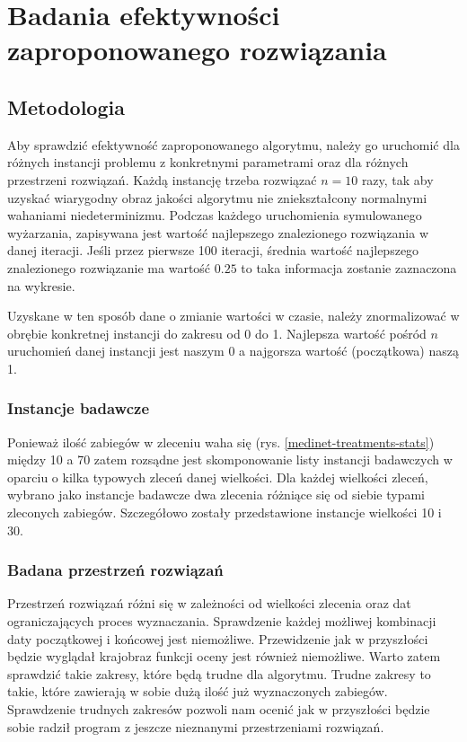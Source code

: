 \chapter{Badania efektywności zaproponowanego rozwiązania}
\section{Metodologia}
Aby sprawdzić efektywność zaproponowanego algorytmu, należy go uruchomić dla różnych instancji problemu
z konkretnymi parametrami oraz dla różnych przestrzeni rozwiązań. Każdą instancję trzeba rozwiązać $n=10$ razy,
tak aby uzyskać wiarygodny obraz jakości algorytmu nie
zniekształcony normalnymi wahaniami niedeterminizmu. Podczas każdego uruchomienia symulowanego wyżarzania,
zapisywana jest wartość najlepszego znalezionego rozwiązania w danej iteracji. Jeśli przez pierwsze 100 iteracji,
średnia wartość najlepszego znalezionego rozwiązanie ma wartość
$0.25$ to taka informacja zostanie zaznaczona na wykresie.

Uzyskane w ten sposób dane o zmianie wartości w czasie, należy
znormalizować w obrębie konkretnej instancji do zakresu od 0 do 1. Najlepsza wartość
pośród $n$ uruchomień danej instancji jest naszym 0 a najgorsza wartość
(początkowa) naszą 1.

\subsection{Instancje badawcze}
Ponieważ ilość zabiegów w zleceniu waha się (rys. \ref{medinet-treatments-stats}) między 10 a 70
zatem rozsądne jest skomponowanie listy instancji badawczych w oparciu o kilka
typowych zleceń danej wielkości. Dla każdej wielkości zleceń, wybrano jako
instancje badawcze dwa zlecenia różniące się od siebie typami zleconych zabiegów.
Szczegółowo zostały przedstawione instancje wielkości 10 i 30.
\newpage
\subsection{Badana przestrzeń rozwiązań}
Przestrzeń rozwiązań różni się w zależności od wielkości zlecenia oraz dat
ograniczających proces wyznaczania. Sprawdzenie każdej możliwej kombinacji daty
początkowej i końcowej jest niemożliwe. Przewidzenie jak w przyszłości będzie
wyglądał krajobraz funkcji oceny jest również niemożliwe. Warto zatem sprawdzić
takie zakresy, które będą trudne dla algorytmu. Trudne zakresy to takie, które
zawierają w sobie dużą ilość już wyznaczonych zabiegów. Sprawdzenie trudnych
zakresów pozwoli nam ocenić jak w przyszłości będzie sobie radził program z
jeszcze nieznanymi przestrzeniami rozwiązań.

